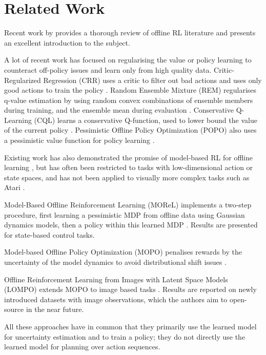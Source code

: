 \documentclass{article}
\begin{document}
\section{Related Work}

Recent work by \cite{levine2020offline} provides a thorough review of offline RL literature and presents an excellent introduction to the subject.

A lot of recent work has focused on regularising the value or policy learning to counteract off-policy issues and learn only from high quality data. Critic-Regularized Regression (CRR) uses a critic to filter out bad actions and uses only good actions to train the policy \cite{wang2020critic}. Random Ensemble Mixture (REM) regularises q-value estimation by using random convex combinations of ensemble members during training, and the ensemble mean during evaluation \cite{agarwal2020optimistic}. Conservative Q-Learning (CQL) learns a conservative Q-function, used to lower bound the value of the current policy \cite{kumar2020conservative}. Pessimistic Offline Policy Optimization (POPO) also uses a pessimistic value function for policy learning \cite{he2021popo}.

Existing work has also demonstrated the promise of model-based RL for offline learning \cite{matsushima2020deploymentefficient,argenson2020modelbased}, but has often been restricted to tasks with low-dimensional action or state spaces, and has not been applied to visually more complex tasks such as Atari \cite{ALE}.

Model-Based Offline Reinforcement Learning (MOReL) implements a two-step procedure, first learning a pessimistic MDP from offline data using Gaussian dynamics models, then a policy within this learned MDP \cite{kidambi2020morel}. Results are presented for state-based control tasks.

Model-based Offline Policy Optimization (MOPO) penalises rewards by the uncertainty of the model dynamics to avoid distributional shift issues \cite{yu2020mopo}.

Offline Reinforcement Learning from Images with Latent Space Models (LOMPO) extends MOPO to image based tasks \cite{rafailov2020offline}. Results are reported on newly introduced datasets with image observations, which the authors aim to open-source in the near future.

All these approaches have in common that they primarily use the learned model for uncertainty estimation and to train a policy; they do not directly use the learned model for planning over action sequences.
\end{document}
